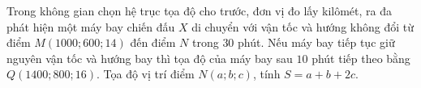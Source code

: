 \begin{ex}%
	Trong không gian chọn hệ trục tọa độ cho trước, đơn vị đo lấy kilômét, ra đa phát 
	hiện một máy bay chiến đấu $X$ di chuyển với vận tốc và hướng không đổi từ điểm $M\left(1000;600;14 \right)$ đến điểm $N$ trong $30$ phút. Nếu máy bay tiếp tục giữ nguyên vận tốc và hướng bay thì tọa độ của máy bay sau $10$ phút tiếp theo bằng $Q\left(1400;800;16 \right)$. Tọa độ vị trí điểm $N\left(a;b;c \right)$, tính 
	$S=a+b+2c$.
\end{ex}


